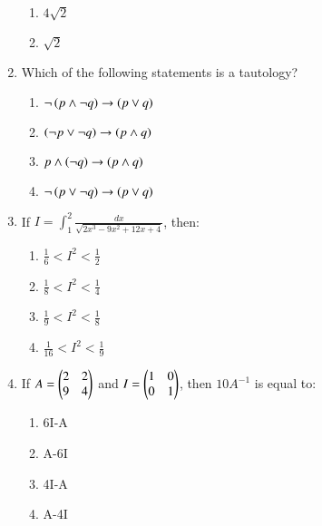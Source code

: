 \documentclass[journal,12pt,onecolumn]{IEEEtran}
\theoremstyle{remark}
\begin{document}
\begin{enumerate}
\begin{enumerate}
        \item $4\sqrt{2}$
        \item $\sqrt{2}$
    \end{enumerate}
    \item Which of the following statements is a tautology?
    \begin{enumerate}
        \item $\neg\left(p \land \neg q\right) \rightarrow \left(p \lor q\right)$
        \item $\left(\neg p \lor \neg q\right) \rightarrow \left(p \land q\right)$
        \item $ p \land \left(\neg q\right) \rightarrow \left(p \land q\right)$
        \item $\neg\left(p \lor \neg q\right) \rightarrow \left(p \lor q\right)$
    \end{enumerate}
    \item If $I=\int_{1}^{2} \frac{dx}{\sqrt{2x^3-9x^2+12x+4}}$, then:
    \begin{enumerate}
        \item $\frac{1}{6}<I^2<\frac{1}{2}$
        \item $\frac{1}{8}<I^2<\frac{1}{4}$
        \item $\frac{1}{9}<I^2<\frac{1}{8}$
        \item $\frac{1}{16}<I^2<\frac{1}{9}$
    \end{enumerate}
    \item If $A = \begin{pmatrix}2 & 2 \\ 9 & 4\end{pmatrix} $ and $I=\begin{pmatrix}1 & 0 \\ 0 & 1\end{pmatrix}$, then $10 A^{-1}$ is equal to:
    \begin{enumerate}
        \item 6I-A
        \item A-6I
        \item 4I-A
         \item A-4I
    \end{enumerate}
    \end{enumerate}
\end{document}
